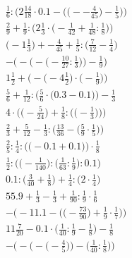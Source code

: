 \documentclass[8pt]{article}
\begin{document}
\begin{align}
\frac{1}{6} : \bigg(2\frac{14}{18} \cdot 0.1 - \Big(\big(--\frac{4}{45}\big) - \frac{1}{5}\Big)\bigg) \\
\frac{2}{9} + \frac{1}{9} : \Big(2\frac{1}{3} \cdot \big(-\frac{1}{42} + \frac{1}{48} : \frac{1}{8}\big)\Big) \\
\big(-1\frac{1}{3}\big) + -\frac{4}{45} + \frac{1}{5} : \big(\frac{7}{12} - \frac{1}{4}\big) \\
-\bigg(-\Big(-\big(-\frac{10}{27} : \frac{1}{3}\big)\Big) - \frac{1}{9}\bigg) \\
1\frac{1}{2} + \Big(-\big(-4\frac{1}{2}\big) \cdot \big(-\frac{1}{9}\big)\Big) \\
\frac{5}{6} + \frac{1}{12} : \Big(\frac{5}{6} \cdot \big(0.3 - 0.1\big)\Big) - \frac{1}{3} \\
4 \cdot \bigg(\Big(-\frac{5}{24}\Big) + \frac{1}{8} : \Big(\big(-\frac{1}{3}\big)\Big)\bigg) \\
\frac{2}{3} + \frac{5}{12} - \frac{1}{3} : \Big(\frac{13}{36} - \big(\frac{5}{9} \cdot \frac{1}{5}\big)\Big) \\
\frac{2}{5} : \frac{1}{4} : \Big(\big(-0.1 + 0.1\big)\Big) \cdot \frac{1}{8} \\
\frac{1}{2} : \Big(\big(-\frac{1}{140}\big) : \big(\frac{1}{63} : \frac{1}{9}\big) : 0.1\Big) \\
0.1 : \big(\frac{3}{40} + \frac{1}{8}\big) + \frac{1}{4} : \big(2 \cdot \frac{1}{4}\big) \\
55.9 + \frac{1}{3} - \frac{1}{3} + \frac{1}{90} : \frac{1}{9} \cdot \frac{1}{6} \\
-\bigg(-11.1 - \Big(\big(-\frac{73}{90}\big) + \frac{1}{9} \cdot \frac{1}{7}\Big)\bigg) \\
11\frac{7}{20} - 0.1 \cdot \big(\frac{1}{40} : \frac{1}{9} - \frac{1}{8}\big) - \frac{1}{8} \\
-\bigg(-\Big(-\big(-\frac{4}{5}\big)\Big) - \Big(\frac{1}{40} : \frac{1}{8}\Big)\bigg)
\end{align}
\end{document}
